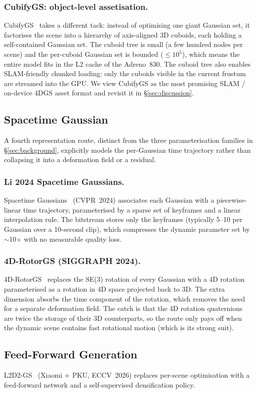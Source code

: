 \subsubsection{CubifyGS: object-level assetisation.}
CubifyGS~\cite{ren2026cubifygs} takes a different tack: instead
of optimising one giant Gaussian set, it factorises the scene
into a hierarchy of axis-aligned 3D cuboids, each holding a
self-contained Gaussian set. The cuboid tree is small (a few
hundred nodes per scene) and the per-cuboid Gaussian set is
bounded ($\le\!10^{5}$), which means the entire model fits in
the L2 cache of the Adreno~830. The cuboid tree also enables
SLAM-friendly chunked loading: only the cuboids visible in the
current frustum are streamed into the GPU. We view CubifyGS as
the most promising SLAM / on-device 4DGS asset format and
revisit it in \S\ref{sec:discussion}.

\subsection{Spacetime Gaussian}
A fourth representation route, distinct from the three
parameterisation families in \S\ref{sec:background}, explicitly
models the per-Gaussian time trajectory rather than collapsing
it into a deformation field or a residual.

\subsubsection{Li 2024 Spacetime Gaussians.}
Spacetime Gaussians~\cite{li2024spacetimegaussians} (CVPR~2024)
associates each Gaussian with a piecewise-linear time
trajectory, parameterised by a sparse set of keyframes and a
linear interpolation rule. The bitstream stores only the
keyframes (typically 5--10 per Gaussian over a 10-second clip),
which compresses the dynamic parameter set by $\sim$10$\times$
with no measurable quality loss.

\subsubsection{4D-RotorGS (SIGGRAPH 2024).}
4D-RotorGS~\cite{duan20244drotorgs} replaces the SE(3) rotation
of every Gaussian with a 4D rotation parameterised as a
rotation in 4D space projected back to 3D. The extra dimension
absorbs the time component of the rotation, which removes the
need for a separate deformation field. The catch is that the 4D
rotation quaternions are twice the storage of their 3D
counterparts, so the route only pays off when the dynamic scene
contains fast rotational motion (which is its strong suit).

\subsection{Feed-Forward Generation}
L2D2-GS~\cite{song2026l2d2gs} (Xiaomi + PKU, ECCV~2026) replaces
per-scene optimisation with a feed-forward network and a
self-supervised densification policy.


